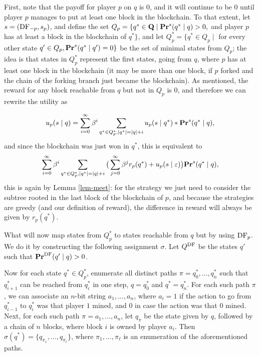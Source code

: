 First, note that the payoff for player $p$ on $q$ is $0$, and it will continue to be $0$ until player $p$ manages to put at least one block in the blockchain. To that extent, let $s = (\text{\rm DF}_{-p},s_p)$, and define the set 
$Q_p = \{q^* \in \mathbf{Q} \mid \mathbf{Pr}^s(q^* \mid q) > 0, $ and player $p$ has at least a block in the blockchain of $q^* \}$, 
and let $Q^*_p=\{q^* \in Q_p \mid$ for every other state $q' \in Q_p, \mathbf{Pr}^s(q^* \mid q')=0 \}$ be the set of minimal states from $Q_p$; 
the idea is that states in $Q^*_p$ represent the first states, going from $q$, where $p$ has at least one block in the blockchain 
(it may be more than one block, if $p$ forked and the chain of the forking branch just became the blockchain). 
As mentioned, the reward for any block reachable from $q$ but not in $Q_p$ is $0$, and therefore we can rewrite the utility as

$$u_p( s \mid q) = \sum_{i=0}^\infty \beta^i \sum_{q^* \in Q^*_p, |q^*| = |q| + i} u_p(s \mid q^*) * \mathbf{Pr}^s(q^* \mid q), $$
and since the blockchain was just won in $q^*$, %
this is equivalent to 
$$ \sum_{i=0}^\infty \beta^i \sum_{q^* \in Q^*_p, |q^*| = |q| + i} \big(\sum_{j = 0}^\infty \beta^j r_p(q^*) + u_p(s \mid \varepsilon) \big) \mathbf{Pr}^s(q^* \mid q), $$
this is again by Lemma \ref{lem-meet}: for the strategy we just need to consider the subtree rooted in the last block of the blockchain of $p$, and 
because the strategies are greedy (and our definition of reward), the difference in reward will always be given by $r_p(q^*)$. 

What will now map states from $Q^*_p$ to states reachable from $q$ but by using $\text{\rm DF}_p$. We do it by constructing the following assignment $\sigma$.
Let $Q^{\text{\rm DF}}$ be the states $q'$ such that $\mathbf{Pr}^{\text{\rm DF}}(q' \mid q) > 0$. 

Now for each state $q^* \in Q^*_p$, enumerate all distinct paths $\pi = q^*_0,\dots,q_n^*$ such that $q_{i+1}^*$ can be reached from 
$q_i^*$ in one step, $q = q_0^*$ and $q^* = q_n^*$. For each such path $\pi$, we can associate an $n$-bit string $a_1,\dots,a_n$, 
where $a_i = 1$ if the action to go from $q_{i-1}^*$ to $q_i^*$ was that player $1$ mined, and $0$ in case the action was that $0$ mined. 
Next, for each such path $\pi = a_1,\dots,a_n$, let $q_\pi$ be the state given by $q$, followed by a chain of $n$ blocks, where block $i$ is 
owned by player $a_i$. Then $\sigma(q^*) = \{q_{\pi_1},\dots,q_{\pi_\ell}\}$, where $\pi_1,\dots,\pi_\ell$ is an enumeration of the aforementioned paths. 

